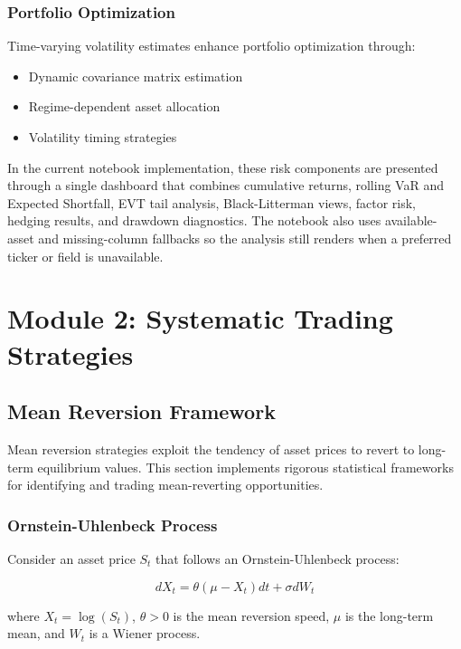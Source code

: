 \documentclass[12pt,a4paper]{article}
\begin{document}
\subsubsection{Portfolio Optimization}

Time-varying volatility estimates enhance portfolio optimization through:
\begin{itemize}
    \item Dynamic covariance matrix estimation
    \item Regime-dependent asset allocation
    \item Volatility timing strategies
\end{itemize}

In the current notebook implementation, these risk components are presented through a single dashboard that combines cumulative returns, rolling VaR and Expected Shortfall, EVT tail analysis, Black-Litterman views, factor risk, hedging results, and drawdown diagnostics. The notebook also uses available-asset and missing-column fallbacks so the analysis still renders when a preferred ticker or field is unavailable.

\section{Module 2: Systematic Trading Strategies}

\subsection{Mean Reversion Framework}

Mean reversion strategies exploit the tendency of asset prices to revert to long-term equilibrium values. This section implements rigorous statistical frameworks for identifying and trading mean-reverting opportunities.

\subsubsection{Ornstein-Uhlenbeck Process}

Consider an asset price $S_t$ that follows an Ornstein-Uhlenbeck process:

\begin{equation}
dX_t = \theta(\mu - X_t)dt + \sigma dW_t
\end{equation}

where $X_t = \log(S_t)$, $\theta > 0$ is the mean reversion speed, $\mu$ is the long-term mean, and $W_t$ is a Wiener process.
\end{document}
